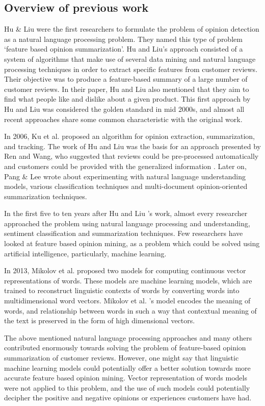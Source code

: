 \documentclass{sig-alternate}
\begin{document}
\subsection{Overview of previous work}
Hu \& Liu \cite{HuLiu2004} were the first researchers to formulate the problem of opinion detection as a natural language processing problem. They named this type of problem `feature based opinion summarization'. Hu and Liu's approach consisted of a system of algorithms that make use of several data mining and natural language processing techniques in order to extract specific features from customer reviews. Their objective was to produce a feature-based summary of a large number of customer reviews. In their paper, Hu and Liu also mentioned that they aim to find what people like and dislike about a given product. This first approach by Hu and Liu was considered the golden standard in mid 2000s, and almost all recent approaches share some common characteristic with the original work. 

In 2006, Ku et al. proposed an algorithm for opinion extraction, summarization, and tracking. The work of Hu and Liu was the basis for an approach presented by Ren and Wang, who suggested that reviews could be pre-processed automatically and customers could be provided with the generalized information \cite{RenWang}. Later on, Pang \& Lee \cite{PangLee2008} wrote about experimenting with natural language understanding models, various classification techniques and multi-document opinion-oriented summarization techniques. 

In the first five to ten years after Hu and Liu \cite{HuLiu2004}'s work, almost every researcher approached the problem using natural language processing and understanding, sentiment classification and summarization techniques. Few researchers have looked at feature based opinion mining, as a problem which could be solved using artificial intelligence, particularly, machine learning.

In 2013, Mikolov et al. \cite{MikolovChenCorradoDean2013b} proposed two models for computing continuous vector representations of words. These models are machine learning models, which are trained to reconstruct linguistic contexts of words by converting words into multidimensional word vectors. Mikolov et al. \cite{MikolovChenCorradoDean2013a}'s model encodes the meaning of words, and relationship between words in such a way that contextual meaning of the text is preserved in the form of high dimensional vectors.

The above mentioned natural language processing approaches and many others contributed enormously towards solving the problem of feature-based opinion summarization of customer reviews. However, one might say that linguistic machine learning models could potentially offer a better solution towards more accurate feature based opinion mining. Vector representation of words models were not applied to this problem, and the use of such models could potentially decipher the positive and negative opinions or experiences customers have had.
\end{document}
